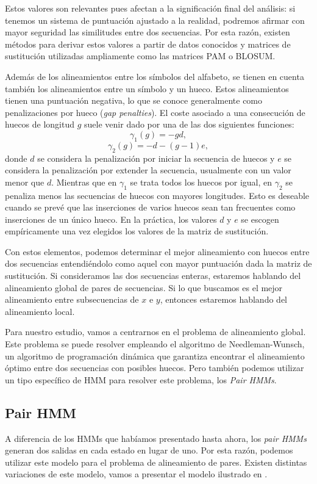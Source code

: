 Estos valores son relevantes pues afectan a la significación final del análisis: si tenemos un sistema de puntuación ajustado a la realidad, podremos afirmar con mayor seguridad las similitudes entre dos secuencias. Por esta razón, existen métodos para derivar estos valores a partir de datos conocidos y matrices de sustitución utilizadas ampliamente como las matrices PAM o BLOSUM.

Además de los alineamientos entre los símbolos del alfabeto, se tienen en cuenta también los alineamientos entre un símbolo y un hueco. Estos alineamientos tienen una puntuación negativa, lo que se conoce generalmente como penalizaciones por hueco (\textit{gap penalties}). El coste asociado a una consecución de huecos de longitud $g$ suele venir dado por una de las dos siguientes funciones:
\[\gamma_1(g)=-gd,\]
\[\gamma_2(g)=-d-(g-1)e,\]
donde $d$ se considera la penalización por iniciar la secuencia de huecos y $e$ se considera la penalización por extender la secuencia, usualmente con un valor menor que $d$. Mientras que en $\gamma_1$ se trata todos los huecos por igual, en $\gamma_2$ se penaliza menos las secuencias de huecos con mayores longitudes. Esto es deseable cuando se prevé que las inserciones de varios huecos sean tan frecuentes como inserciones de un único hueco. En la práctica, los valores $d$ y $e$ se escogen empíricamente una vez elegidos los valores de la matriz de sustitución.

Con estos elementos, podemos determinar el mejor alineamiento con huecos entre dos secuencias entendiéndolo como aquel con mayor puntuación dada la matriz de sustitución. Si consideramos las dos secuencias enteras, estaremos hablando del alineamiento global de pares de secuencias. Si lo que buscamos es el mejor alineamiento entre subsecuencias de $x$ e $y$, entonces estaremos hablando del alineamiento local.

Para nuestro estudio, vamos a centrarnos en el problema de alineamiento global. Este problema se puede resolver empleando el algoritmo de Needleman-Wunsch, un algoritmo de programación dinámica que garantiza encontrar el alineamiento óptimo entre dos secuencias con posibles huecos. Pero también podemos utilizar un tipo específico de HMM para resolver este problema, los \textit{Pair HMMs}.

\subsection{Pair HMM}
A diferencia de los HMMs que habíamos presentado hasta ahora, los \textit{pair HMMs} generan dos salidas en cada estado en lugar de uno. Por esta razón, podemos utilizar este modelo para el problema de alineamiento de pares. Existen distintas variaciones de este modelo, vamos a presentar el modelo ilustrado en \cite{Durbin}. 

